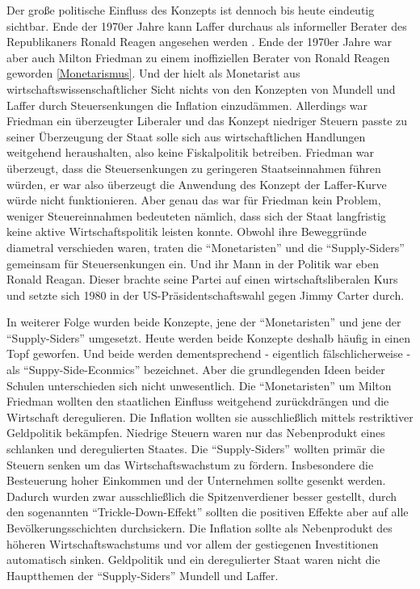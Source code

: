 Der große politische Einfluss des Konzepts ist dennoch bis heute eindeutig sichtbar. Ende der 1970er Jahre kann Laffer durchaus als informeller Berater des Republikaners Ronald Reagen angesehen werden \parencite[S. 142]{Appelbaum2019}. Ende der 1970er Jahre war aber auch Milton Friedman zu einem inoffiziellen Berater von Ronald Reagen geworden \ref{Monetarismus}. Und der hielt als Monetarist aus wirtschaftswissenschaftlicher Sicht nichts von den Konzepten von Mundell und Laffer durch Steuersenkungen die Inflation einzudämmen. Allerdings war Friedman ein überzeugter Liberaler und das Konzept niedriger Steuern passte zu seiner Überzeugung der Staat solle sich aus wirtschaftlichen Handlungen weitgehend heraushalten, also keine Fiskalpolitik betreiben. Friedman war überzeugt, dass die Steuersenkungen zu geringeren Staatseinnahmen führen würden, er war also überzeugt die Anwendung des Konzept der Laffer-Kurve würde nicht funktionieren. Aber genau das war für Friedman kein Problem, weniger Steuereinnahmen bedeuteten nämlich, dass sich der Staat langfristig keine aktive Wirtschaftspolitik leisten konnte. Obwohl ihre Beweggründe diametral verschieden waren, traten die "`Monetaristen"' und die "`Supply-Siders"' gemeinsam für Steuersenkungen ein. Und ihr Mann in der Politik war eben Ronald Reagan. Dieser brachte seine Partei auf einen wirtschaftsliberalen Kurs und setzte sich 1980 in der US-Präsidentschaftswahl gegen Jimmy Carter durch.

In weiterer Folge wurden beide Konzepte, jene der "`Monetaristen"' und jene der "`Supply-Siders"' umgesetzt. Heute werden beide Konzepte deshalb häufig in einen Topf geworfen. Und beide werden dementsprechend - eigentlich fälschlicherweise - als "`Suppy-Side-Econmics"' bezeichnet. Aber die grundlegenden Ideen beider Schulen unterschieden sich nicht unwesentlich. Die "`Monetaristen"' um Milton Friedman wollten den staatlichen Einfluss weitgehend zurückdrängen und die Wirtschaft deregulieren. Die Inflation wollten sie ausschließlich mittels restriktiver Geldpolitik bekämpfen. Niedrige Steuern waren nur das Nebenprodukt eines schlanken und deregulierten Staates.
Die "`Supply-Siders"' wollten primär die Steuern senken um das Wirtschaftswachstum zu fördern. Insbesondere die Besteuerung hoher Einkommen und der Unternehmen sollte gesenkt werden. Dadurch wurden zwar ausschließlich die Spitzenverdiener besser gestellt, durch den sogenannten "`Trickle-Down-Effekt"' sollten die positiven Effekte aber auf alle Bevölkerungsschichten durchsickern. Die Inflation sollte als Nebenprodukt des höheren Wirtschaftswachstums und vor allem der gestiegenen Investitionen automatisch sinken. Geldpolitik und ein deregulierter Staat waren nicht die Hauptthemen der "`Supply-Siders"' Mundell und Laffer. 

